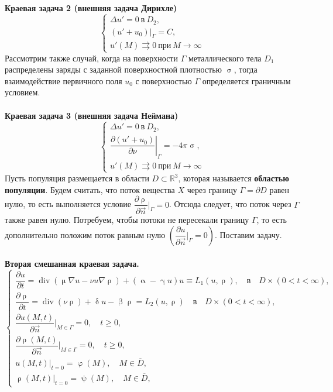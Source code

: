 \documentclass[a4paper, 12pt]{report}
\numberwithin{equation}{section}
\renewcommand{\geq}{\geqslant}
\renewcommand{\alpha}{\upalpha}
\renewcommand{\beta}{\upbeta}
\renewcommand{\gamma}{\upgamma}
\renewcommand{\delta}{\updelta}
\renewcommand{\varphi}{\upvarphi}
\renewcommand{\sigma}{\upsigma}
\renewcommand{\psi}{\uppsi}
\renewcommand{\mu}{\upmu}
\renewcommand{\rho}{\uprho}
\begin{document}
\\\\
\textbf{Краевая задача 2 (внешняя задача Дирихле)}
\begin{equation}
\begin{cases}
    \Delta u' = 0\ \text{в}\ D_2, \\ (u' + u_0)|_\Gamma = C, \\ u'(M) \rightrightarrows 0\ \text{при}\ M \rightarrow \infty
\end{cases}
\end{equation}
Рассмотрим также случай, когда на поверхности $\Gamma$ металлического тела $D_1$ распределены заряды с заданной поверхностной плотностью $\sigma$, тогда взаимодействие первичного поля $u_0$ с поверхностью $\Gamma$ определяется граничным условием.
\\\\
\textbf{Краевая задача 3 (внешняя задача Неймана)}
\begin{equation}
    \begin{cases}
        \Delta u' = 0\ \text{в}\ D_2, \\ \left. \dfrac{\partial (u' + u_0)}{\partial \nu} \right|_\Gamma = -4\pi \sigma, \\ u'(M) \rightrightarrows 0\ \text{при}\ M \rightarrow \infty
    \end{cases}
\end{equation}
Пусть популяция размещается в области \(D \subset \mathbb{R}^3\), которая называется \textbf{областью популяции}. Будем считать, что поток вещества \(X\) через границу \(\Gamma = \partial D\) равен нулю, то есть выполняется условие \(\dfrac{\partial \rho}{\partial \vec{n}} \bigg|_{\Gamma} = 0\). Отсюда следует, что поток через \(\Gamma\) также равен нулю. Потребуем, чтобы потоки не пересекали границу \(\Gamma\), то есть дополнительно положим поток равным нулю \(\left( \dfrac{\partial u}{\partial \vec{n}} \bigg|_{\Gamma} = 0 \right)\). Поставим задачу.
\\\\
\textbf{Вторая смешанная краевая задача.}
\begin{equation}
\label{cr-3}
    \begin{cases}
        \dfrac{\partial u}{\partial t} = \operatorname{div} (\mu \nabla u-\nu u\nabla \rho)+(\alpha - \gamma u) u \equiv L_1(u,\rho),\quad \text{в} \quad D \times (0 < t < \infty),\\
        \dfrac{\partial \rho}{\partial t} =\operatorname{div} (\nu \rho)+\delta u-\beta \rho= L_2(u, \rho) \quad \text{в} \quad D \times (0 < t < \infty),\\
        \dfrac{\partial u(M, t)}{\partial \vec{n}} \bigg|_{M \in \Gamma} = 0, \quad t \geq 0,\\ 
        \dfrac{\partial \rho(M, t)}{\partial \vec{n}} \bigg|_{M \in \Gamma} = 0, \quad t \geq 0,\\
        u(M,t)\big|_{t=0} = \varphi(M), \quad M \in \overline{D}, 
        \\ \rho(M,t)\big|_{t=0} = \psi(M), \quad M \in \overline{D},
    \end{cases}
\end{equation}
\end{document}
